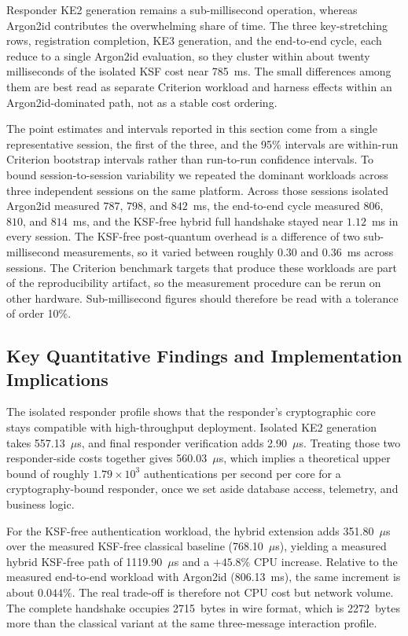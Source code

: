 \documentclass[preprint,12pt]{elsarticle}
\theoremstyle{remark}
\begin{document}
Responder KE2 generation remains a sub-millisecond operation, whereas Argon2id
contributes the overwhelming share of time. The three key-stretching rows,
registration completion, KE3 generation, and the end-to-end cycle, each reduce to
a single Argon2id evaluation, so they cluster within about twenty milliseconds of
the isolated KSF cost near 785~ms. The small differences among them are best read
as separate Criterion workload and harness effects within an Argon2id-dominated
path, not as a stable cost ordering.

The point estimates and intervals reported in this section come from a single
representative session, the first of the three, and the 95\% intervals are
within-run Criterion bootstrap intervals rather than run-to-run confidence
intervals. To bound session-to-session variability we repeated the dominant
workloads across three independent sessions on the same platform. Across those
sessions isolated Argon2id measured $787$, $798$, and $842$~ms, the end-to-end
cycle measured $806$, $810$, and $814$~ms, and the KSF-free hybrid full handshake
stayed near $1.12$~ms in every session. The KSF-free post-quantum overhead is a
difference of two sub-millisecond measurements, so it varied between roughly
$0.30$ and $0.36$~ms across sessions. The Criterion benchmark targets that
produce these workloads are part of the reproducibility artifact, so the
measurement procedure can be rerun on other hardware. Sub-millisecond figures should therefore be
read with a tolerance of order 10\%.

\subsection{Key Quantitative Findings and Implementation Implications}

The isolated responder profile shows that the responder's cryptographic
core stays compatible with high-throughput deployment. Isolated KE2
generation takes 557.13~$\mu$s, and final responder verification adds
2.90~$\mu$s. Treating those two responder-side costs together gives
560.03~$\mu$s, which implies a theoretical upper bound of roughly
$1.79 \times 10^3$ authentications per second per core for a
cryptography-bound responder, once we set aside database access, telemetry,
and business logic.

For the KSF-free authentication workload, the hybrid extension adds
351.80~$\mu$s over the measured KSF-free classical baseline
(768.10~$\mu$s), yielding a measured hybrid KSF-free path of
1119.90~$\mu$s and a $+45.8\%$ CPU increase. Relative to the measured
end-to-end workload with Argon2id (806.13~ms), the same increment is about
$0.044\%$. The real trade-off is therefore not CPU cost but network volume.
The complete handshake occupies
2715~bytes in wire format, which is 2272~bytes more than the classical
variant at the same three-message interaction profile.
\end{document}
